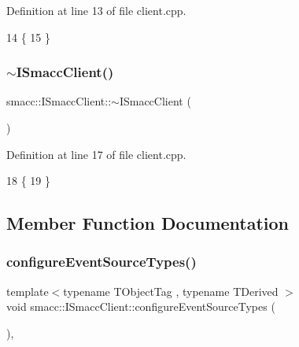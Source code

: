 Definition at line 13 of file client.\+cpp.


\begin{DoxyCode}
14 \{
15 \}
\end{DoxyCode}
\mbox{\label{classsmacc_1_1ISmaccClient_a030e17771bf2e404a6fad97273c4d7f4}} 
\subsubsection{\texorpdfstring{$\sim$\+I\+Smacc\+Client()}{~ISmaccClient()}}
{\footnotesize\ttfamily smacc\+::\+I\+Smacc\+Client\+::$\sim$\+I\+Smacc\+Client (\begin{DoxyParamCaption}{ }\end{DoxyParamCaption})\hspace{0.3cm}{\ttfamily [virtual]}}



Definition at line 17 of file client.\+cpp.


\begin{DoxyCode}
18 \{
19 \}
\end{DoxyCode}


\subsection{Member Function Documentation}
\mbox{\label{classsmacc_1_1ISmaccClient_a643285b93f2bd33987e0d0d1a12caf10}} 
\subsubsection{\texorpdfstring{configure\+Event\+Source\+Types()}{configureEventSourceTypes()}}
{\footnotesize\ttfamily template$<$typename T\+Object\+Tag , typename T\+Derived $>$ \\
void smacc\+::\+I\+Smacc\+Client\+::configure\+Event\+Source\+Types (\begin{DoxyParamCaption}{ }\end{DoxyParamCaption})\hspace{0.3cm}{\ttfamily [inline]}, {\ttfamily [protected]}}



